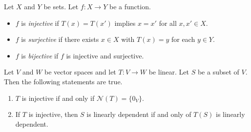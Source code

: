 \begin{definition}
  \label{def:types-of-function}
  Let $X$ and $Y$ be sets.
  Let $f: X \to Y$ be a function.
  \begin{itemize}
    \item $f$ is \emph{injective} if $T(x) = T(x')$ implies $x = x'$
    for all $x, x' \in X$.
    \item $f$ is \emph{surjective} if there exists $x \in X$ with $T(x) = y$
    for each $y \in Y$.
    \item $f$ is \emph{bijective} if $f$ is injective and surjective.
  \end{itemize}
\end{definition}

\begin{proposition}
  \label{thm:linear-injection}
  Let $V$ and $W$ be vector spaces and let ${T: V \to W}$ be linear.
  Let $S$ be a subset of $V$.
  Then the following statements are true.
  \begin{enumerate}
    \item $T$ is injective if and only if $\mathcal{N}(T) = \{0_V\}$.
    \item If $T$ is injective, then $S$ is linearly dependent if and only of
    $T(S)$ is linearly dependent.
  \end{enumerate}
\end{proposition}
